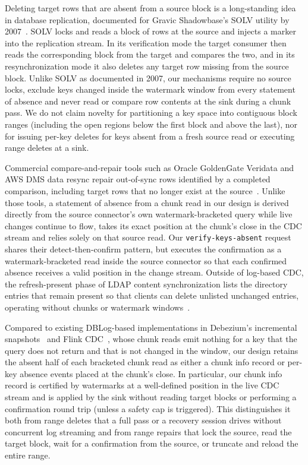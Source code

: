 \documentclass[sigconf,nonacm,10pt]{acmart}
\begin{document}
Deleting target rows that are absent from a source block is a long-standing idea
in database replication, documented for Gravic Shadowbase's SOLV utility by
2007~\cite{availability_digest_2007}. SOLV locks and reads a block of rows at the source and injects a marker into the replication stream. In its verification mode the target consumer then reads the corresponding block from the target and compares the two, and in its resynchronization mode it also deletes any target row missing from the source block.
Unlike SOLV as documented in 2007, our mechanisms require no source locks, exclude keys changed inside the watermark window from every
statement of absence and never read or compare row contents at the sink during
a chunk pass. We do not claim novelty for partitioning a key space into contiguous
block ranges (including the open regions below the first block and above the
last), nor for issuing per-key deletes for keys absent from a fresh source read
or executing range deletes at a sink.

Commercial compare-and-repair tools such as Oracle GoldenGate Veridata and AWS
DMS data resync repair out-of-sync rows identified by a completed comparison,
including target rows that no longer exist at the
source~\cite{goldengate_veridata,aws_dms_resync}. Unlike those tools, a
statement of absence from a chunk read in our design is derived directly from
the source connector's own watermark-bracketed query while live changes continue
to flow, takes its exact position at the chunk's close in the CDC stream and
relies solely on that source read. Our \texttt{verify-keys-absent}
request shares their detect-then-confirm pattern, but executes the confirmation
as a watermark-bracketed read inside the source connector so that each
confirmed absence receives a valid position in the change stream. Outside of log-based
CDC, the refresh-present phase of LDAP content synchronization lists the directory
entries that remain present so that clients can delete unlisted unchanged
entries, operating without chunks or watermark windows~\cite{rfc4533}.

Compared to existing DBLog-based implementations in Debezium's incremental
snapshots~\cite{debezium_incremental_snapshots} and Flink
CDC~\cite{flinkcdc_mysql}, whose chunk reads emit nothing for a key that the query does not return and that
is not changed in the window, our design retains the absent half of each bracketed chunk read
as either a chunk info record or per-key absence events placed at the chunk's close. In particular, our chunk info record is certified by watermarks at a
well-defined position in the live CDC stream and is applied by the sink without
reading target blocks or performing a confirmation round trip (unless a safety
cap is triggered). This distinguishes it both from range deletes that a full pass or a recovery
session drives without concurrent log streaming and from range repairs that
lock the source, read the target block, wait for a confirmation from the
source, or truncate and reload the entire range.
\end{document}
